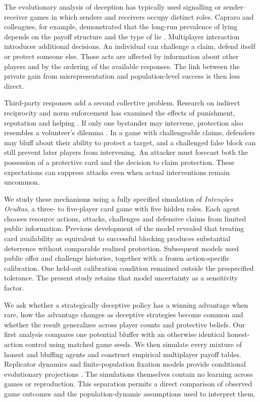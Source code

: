 \documentclass[11pt,a4paper]{article}
\begin{document}
The evolutionary analysis of deception has typically used signalling or sender--receiver games in which senders and receivers occupy distinct roles. Capraro and colleagues, for example, demonstrated that the long-run prevalence of lying depends on the payoff structure and the type of lie \citep{capraro2019}. Multiplayer interaction introduces additional decisions. An individual can challenge a claim, defend itself or protect someone else. Those acts are affected by information about other players and by the ordering of the available responses. The link between the private gain from misrepresentation and population-level success is then less direct.

Third-party responses add a second collective problem. Research on indirect reciprocity and norm enforcement has examined the effects of punishment, reputation and helping \citep{fehr2004,leimar2001,raihani2015,rockenbach2006}. If only one bystander may intervene, protection also resembles a volunteer's dilemma \citep{diekmann1985}. In a game with challengeable claims, defenders may bluff about their ability to protect a target, and a challenged false block can still prevent later players from intervening. An attacker must forecast both the possession of a protective card and the decision to claim protection. These expectations can suppress attacks even when actual interventions remain uncommon.

We study these mechanisms using a fully specified simulation of \emph{Inten\c{c}\~oes Ocultas}, a three- to five-player card game with five hidden roles. Each agent chooses resource actions, attacks, challenges and defensive claims from limited public information. Previous development of the model revealed that treating card availability as equivalent to successful blocking produces substantial deterrence without comparable realized protection. Subsequent models used public offer and challenge histories, together with a frozen action-specific calibration. One held-out calibration condition remained outside the prespecified tolerance. The present study retains that model uncertainty as a sensitivity factor.

We ask whether a strategically deceptive policy has a winning advantage when rare, how the advantage changes as deceptive strategies become common and whether the result generalizes across player counts and protective beliefs. Our first analysis compares one potential bluffer with an otherwise identical honest-action control using matched game seeds. We then simulate every mixture of honest and bluffing agents and construct empirical multiplayer payoff tables. Replicator dynamics and finite-population fixation models provide conditional evolutionary projections \citep{taylor1978,gokhale2014,traulsen2007}. The simulations themselves contain no learning across games or reproduction. This separation permits a direct comparison of observed game outcomes and the population-dynamic assumptions used to interpret them.
\end{document}
